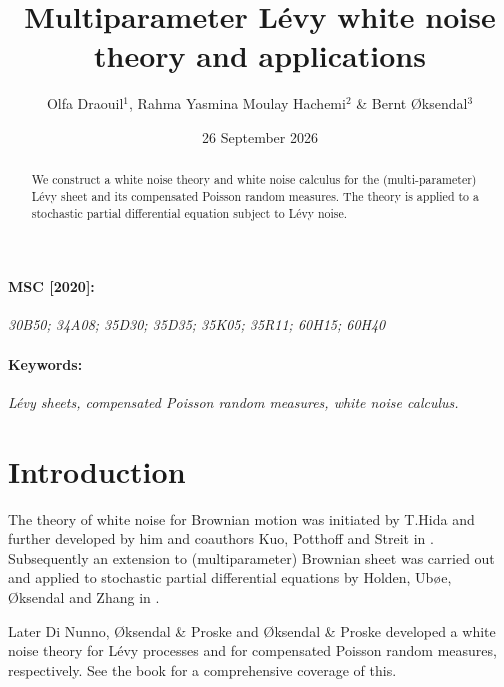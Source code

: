 \documentclass[12pt]{article}%
\numberwithin{equation}{section}
\begin{document}
\title{Multiparameter L\'evy white noise theory and applications}

\author{Olfa Draouil$^{1}$, Rahma Yasmina Moulay Hachemi$^{2}$ \& Bernt \O ksendal$^{3}$
}
\date{26 September 2026}
\maketitle 
{}



\paragraph{MSC [2020]:}
\emph{30B50; 34A08; 35D30; 35D35; 35K05; 35R11; 60H15; 60H40}

\paragraph{Keywords:}
\emph{L\' evy sheets, compensated Poisson random measures, white noise calculus.}

\begin{abstract}
We construct a white noise theory and white noise calculus for the (multi-parameter) L\' evy sheet and its compensated Poisson random measures. The theory is applied to a stochastic partial differential equation subject to L\' evy noise.
  \end{abstract}

\section{Introduction}

The theory of white noise for Brownian motion was initiated by T.Hida \cite{H} and further developed by him and coauthors Kuo, Potthoff and Streit in \cite{HKPS}. Subsequently an extension to (multiparameter)  Brownian sheet was carried out and applied to stochastic partial differential equations by Holden, Ub\o e, \O ksendal and Zhang  in \cite {HOUZ}. 

Later Di Nunno, \O ksendal \& Proske \cite{DOP1} and \O ksendal \& Proske \cite{OP} developed a white noise theory for L\' evy processes and for compensated Poisson random measures, respectively. See the book \cite{DOP} for a comprehensive coverage of this.  
\end{document}
